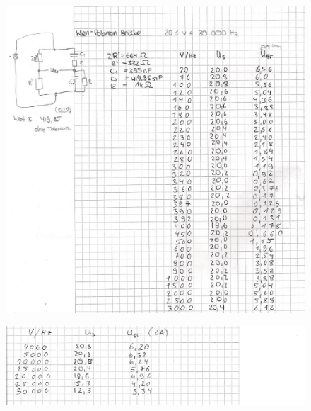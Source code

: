 \begin{figure}
    \centering
    \includegraphics[width=\textwidth]{messdaten2.pdf}
\end{figure}
\begin{figure}
    \centering
    \includegraphics[width=\textwidth]{messdaten3.pdf}
\end{figure}